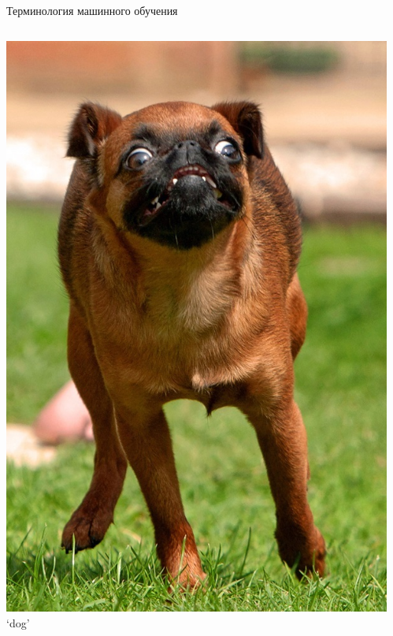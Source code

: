 \documentclass[aspectratio=169, professionalfonts]{beamer}
\begin{document}
\begin{frame}{Терминология машинного обучения}
\begin{columns}
\begin{column}{.1\linewidth}
            \includegraphics[width=\linewidth]{graphs/fig17_8.jpg}
            `dog'
        \end{column}
        \begin{column}{.1\linewidth}
            \centering

\end{column}
\end{columns}
\end{frame}
\end{document}
